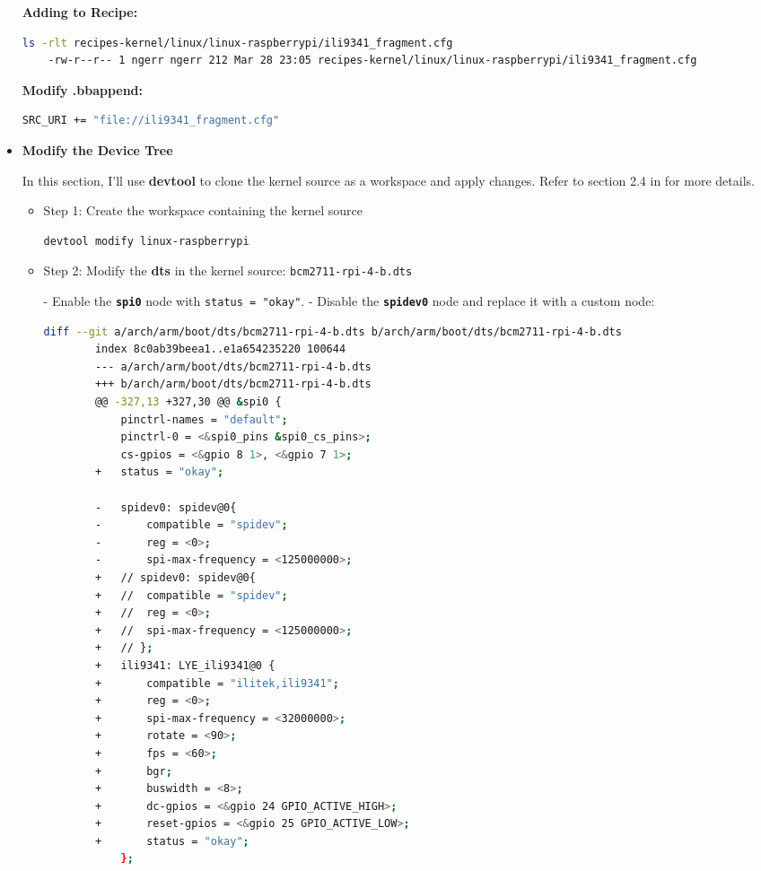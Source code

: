 \documentclass{article}
\begin{document}
\begin{itemize}
    \textbf{Adding to Recipe:}
    \begin{lstlisting}[language=bash]
    ls -rlt recipes-kernel/linux/linux-raspberrypi/ili9341_fragment.cfg
    -rw-r--r-- 1 ngerr ngerr 212 Mar 28 23:05 recipes-kernel/linux/linux-raspberrypi/ili9341_fragment.cfg
    \end{lstlisting}
    
    \textbf{Modify .bbappend:}
    \begin{lstlisting}[language=bash]
    SRC_URI += "file://ili9341_fragment.cfg"
    \end{lstlisting}

    \item \textbf{Modify the Device Tree}

    In this section, I'll use \textbf{devtool} to clone the kernel source as a workspace and apply changes. Refer to section 2.4 in \cite{3} for more details.
    
    \begin{itemize}
        \item Step 1: Create the workspace containing the kernel source
        \begin{lstlisting}[language=bash]
        devtool modify linux-raspberrypi
        \end{lstlisting}

        \item Step 2: Modify the \textbf{dts} in the kernel source: \texttt{bcm2711-rpi-4-b.dts}
        
        - Enable the \texttt{\textbf{spi0}} node with \texttt{status = "okay"}.
        - Disable the \texttt{\textbf{spidev0}} node and replace it with a custom node:
        
        \begin{lstlisting}[language=bash]
        diff --git a/arch/arm/boot/dts/bcm2711-rpi-4-b.dts b/arch/arm/boot/dts/bcm2711-rpi-4-b.dts
        index 8c0ab39beea1..e1a654235220 100644
        --- a/arch/arm/boot/dts/bcm2711-rpi-4-b.dts
        +++ b/arch/arm/boot/dts/bcm2711-rpi-4-b.dts
        @@ -327,13 +327,30 @@ &spi0 {
         	pinctrl-names = "default";
         	pinctrl-0 = <&spi0_pins &spi0_cs_pins>;
         	cs-gpios = <&gpio 8 1>, <&gpio 7 1>;
        +	status = "okay";
         
        -	spidev0: spidev@0{
        -		compatible = "spidev";
        -		reg = <0>;
        -		spi-max-frequency = <125000000>;
        +	// spidev0: spidev@0{
        +	// 	compatible = "spidev";
        +	// 	reg = <0>;
        +	// 	spi-max-frequency = <125000000>;
        +	// };
        +	ili9341: LYE_ili9341@0 {
        +		compatible = "ilitek,ili9341";
        +		reg = <0>;
        +		spi-max-frequency = <32000000>;
        +		rotate = <90>;
        +		fps = <60>;
        +		bgr;
        +		buswidth = <8>;
        +		dc-gpios = <&gpio 24 GPIO_ACTIVE_HIGH>;
        +		reset-gpios = <&gpio 25 GPIO_ACTIVE_LOW>;
        +		status = "okay";
         	};
        \end{lstlisting}
        

\end{itemize}
\end{itemize}
\end{document}
